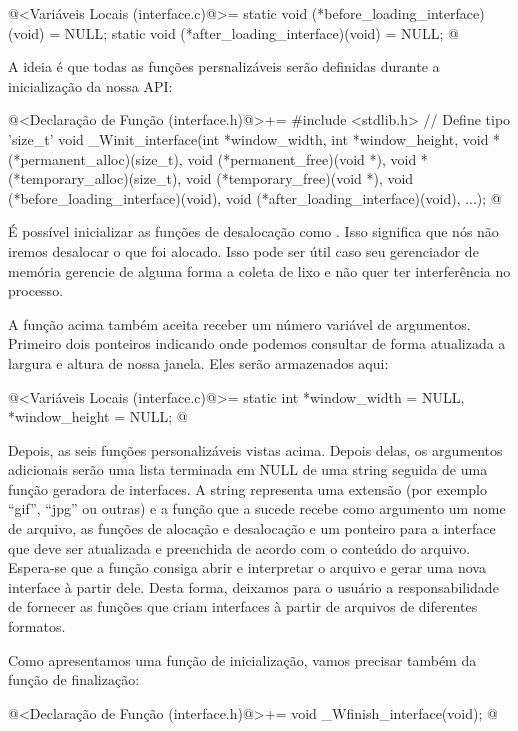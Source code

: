 \iniciocodigo
@<Variáveis Locais (interface.c)@>=
static void (*before_loading_interface)(void) = NULL;
static void (*after_loading_interface)(void) = NULL;
@
\fimcodigo

A ideia é que todas as funções persnalizáveis serão definidas durante
a inicialização da nossa API:

\iniciocodigo
@<Declaração de Função (interface.h)@>+=
#include <stdlib.h> // Define tipo 'size_t'
void _Winit_interface(int *window_width, int *window_height,
                      void *(*permanent_alloc)(size_t),
                      void (*permanent_free)(void *),
                      void *(*temporary_alloc)(size_t),
                      void (*temporary_free)(void *),
                      void (*before_loading_interface)(void),
                      void (*after_loading_interface)(void),
                      ...);
@
\fimcodigo


É possível inicializar as funções de desalocação como
. Isso significa que nós não iremos desalocar o que
foi alocado. Isso pode ser útil caso seu gerenciador de memória
gerencie de alguma forma a coleta de lixo e não quer ter interferência
no processo.

A função acima também aceita receber um número variável de
argumentos. Primeiro dois ponteiros indicando onde podemos consultar
de forma atualizada a largura e altura de nossa janela. Eles serão
armazenados aqui:

\iniciocodigo
@<Variáveis Locais (interface.c)@>=
static int *window_width = NULL, *window_height = NULL;
@
\fimcodigo

Depois, as seis funções personalizáveis vistas
acima. Depois delas, os argumentos adicionais serão uma lista
terminada em NULL de uma string seguida de uma função geradora de
interfaces. A string representa uma extensão (por exemplo ``gif'',
``jpg'' ou outras) e a função que a sucede recebe como argumento um
nome de arquivo, as funções de alocação e desalocação e um ponteiro
para a interface que deve ser atualizada e preenchida de acordo com o
conteúdo do arquivo. Espera-se que a função consiga abrir e
interpretar o arquivo e gerar uma nova interface à partir dele.  Desta
forma, deixamos para o usuário a responsabilidade de fornecer as
funções que criam interfaces à partir de arquivos de diferentes
formatos.

Como apresentamos uma função de inicialização, vamos precisar também
da função de finalização:

\iniciocodigo
@<Declaração de Função (interface.h)@>+=
void _Wfinish_interface(void);
@
\fimcodigo

